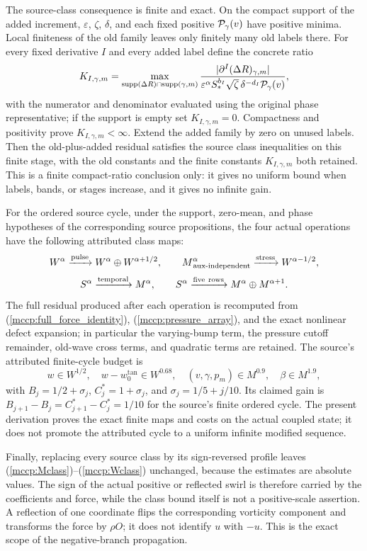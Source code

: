 The source-class consequence is finite and exact. On the compact support
of the added increment, $\varepsilon$, $\zeta$, $\delta$, and each fixed
positive ${\cal P}_\gamma(v)$ have positive minima. Local finiteness of
the old family leaves only finitely many old labels there. For every
fixed derivative $I$ and every added label define the concrete ratio
\[
 K_{I,\gamma,m}=
 \max_{\operatorname{supp}(\Delta R)\cap\operatorname{supp}(\gamma,m)}
 \frac{|\partial^I(\Delta R)_{\gamma,m}|}
 {\varepsilon^\alpha S_*^{b_I}\sqrt\zeta\,\delta^{-d_I}{\cal P}_\gamma(v)},
\]
with the numerator and denominator evaluated using the original phase
representative; if the support is empty set $K_{I,\gamma,m}=0$.
Compactness and positivity prove $K_{I,\gamma,m}<\infty$. Extend the
added family by zero on unused labels. Then the old-plus-added residual
satisfies the source class inequalities on this finite stage, with the
old constants and the finite constants $K_{I,\gamma,m}$ both retained.
This is a finite compact-ratio conclusion only: it gives no uniform bound
when labels, bands, or stages increase, and it gives no infinite gain.

For the ordered source cycle, under the support, zero-mean, and phase
hypotheses of the corresponding source propositions, the four actual
operations have the following attributed class maps:
\[
 W^\alpha\xrightarrow{\rm pulse}W^\alpha\oplus W^{\alpha+1/2},\qquad
 M^\alpha_{\,\mathrm{aux\text{-}independent}}
       \xrightarrow{\rm stress}W^{\alpha-1/2},
\]
\[
 S^\alpha\xrightarrow{\rm temporal}M^\alpha,
 \qquad S^\alpha\xrightarrow{\rm five\ rows}M^\alpha\oplus M^{\alpha+1}.
\]
The full residual produced after each operation is recomputed from
(\ref{mccp:full_force_identity}), (\ref{mccp:pressure_array}), and the
exact nonlinear defect expansion; in particular the varying-bump term,
the pressure cutoff remainder, old-wave cross terms, and quadratic terms
are retained. The source's attributed finite-cycle budget is
\[
 w\in W^{1/2},\quad w-w_0^{\tan}\in W^{0.68},\quad
 (v,\gamma,p_m)\in M^{0.9},\quad \beta\in M^{1.9},
\]
with $B_j=1/2+\sigma_j$, $C_j^*=1+\sigma_j$, and
$\sigma_j=1/5+j/10$. Its claimed gain is
$B_{j+1}-B_j=C_{j+1}^*-C_j^*=1/10$ for the source's finite ordered
cycle. The present derivation proves the exact finite maps and costs on
the actual coupled state; it does not promote the attributed cycle to a
uniform infinite modified sequence.

Finally, replacing every source class by its sign-reversed profile leaves
(\ref{mccp:Mclass})--(\ref{mccp:Wclass}) unchanged, because the estimates
are absolute values. The sign of the actual positive or reflected swirl is
therefore carried by the coefficients and force, while the class bound
itself is not a positive-scale assertion. A reflection of one coordinate
flips the corresponding vorticity component and transforms the force by
$\rho O$; it does not identify $u$ with $-u$. This is the exact scope of
the negative-branch propagation.
\label{mccp:conclusion}








